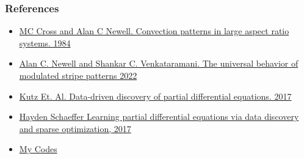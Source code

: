 \documentclass[]{beamer}
\begin{document}
\begin{frame}
    \frametitle{References}
    \begin{itemize}
    \item \href{https://reader.elsevier.com/reader/sd/pii/0167278984901817?token=A7642367BF58BF047EA0B36FF9405D2765AECE238093AEE2121CD36F6E79244B94C8B9C1B05FEAC38C9E9A6C6C6C37DC&originRegion=us-east-1&originCreation=20221012224737}{MC Cross and Alan C Newell. Convection patterns in large aspect ratio systems. 1984}
    \item \href{https://www.cmu.edu/cee/convergence/preprints/UniversalBehaviorModulatedStripePatterns.pdf}{Alan C. Newell and Shankar C. Venkataramani. The universal behavior of modulated stripe patterns 2022}
    \item \href{https://www.science.org/doi/pdf/10.1126/sciadv.1602614}{Kutz Et. Al. Data-driven discovery of partial differential equations. 2017}
    \item \href{https://royalsocietypublishing.org/doi/pdf/10.1098/rspa.2016.0446}{Hayden Schaeffer Learning partial differential equations via data discovery and sparse optimization, 2017}
        \item \href{https://github.com/EMcDugald/convection_patterns}{My Codes}
    \end{itemize}
\end{frame}
\end{document}

